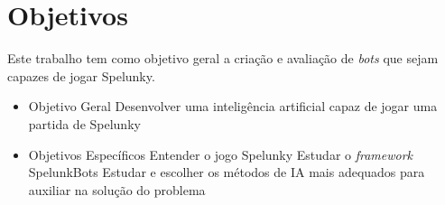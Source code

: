\chapter{\label{chap:objectives}Objetivos}
Este trabalho tem como objetivo geral a criação e avaliação de \textit{bots} que
sejam capazes de jogar Spelunky. 

\begin{itemize}
    \item Objetivo Geral
        \subitem Desenvolver uma inteligência artificial capaz de jogar uma partida de Spelunky
    \item Objetivos Específicos
        \subitem Entender o jogo Spelunky
        \subitem Estudar o \textit{framework} SpelunkBots
        \subitem Estudar e escolher os métodos de IA mais adequados para auxiliar na solução do problema
\end{itemize}
